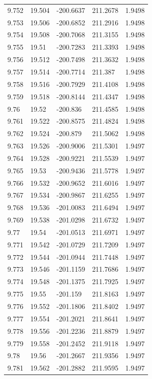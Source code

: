 \begin{tabular}{lllll}
9.752 & 19.504 & -200.6637 & 211.2678 & 1.9498 \\
9.753 & 19.506 & -200.6852 & 211.2916 & 1.9498 \\
9.754 & 19.508 & -200.7068 & 211.3155 & 1.9498 \\
9.755 & 19.51 & -200.7283 & 211.3393 & 1.9498 \\
9.756 & 19.512 & -200.7498 & 211.3632 & 1.9498 \\
9.757 & 19.514 & -200.7714 & 211.387 & 1.9498 \\
9.758 & 19.516 & -200.7929 & 211.4108 & 1.9498 \\
9.759 & 19.518 & -200.8144 & 211.4347 & 1.9498 \\
9.76 & 19.52 & -200.836 & 211.4585 & 1.9498 \\
9.761 & 19.522 & -200.8575 & 211.4824 & 1.9498 \\
9.762 & 19.524 & -200.879 & 211.5062 & 1.9498 \\
9.763 & 19.526 & -200.9006 & 211.5301 & 1.9497 \\
9.764 & 19.528 & -200.9221 & 211.5539 & 1.9497 \\
9.765 & 19.53 & -200.9436 & 211.5778 & 1.9497 \\
9.766 & 19.532 & -200.9652 & 211.6016 & 1.9497 \\
9.767 & 19.534 & -200.9867 & 211.6255 & 1.9497 \\
9.768 & 19.536 & -201.0083 & 211.6494 & 1.9497 \\
9.769 & 19.538 & -201.0298 & 211.6732 & 1.9497 \\
9.77 & 19.54 & -201.0513 & 211.6971 & 1.9497 \\
9.771 & 19.542 & -201.0729 & 211.7209 & 1.9497 \\
9.772 & 19.544 & -201.0944 & 211.7448 & 1.9497 \\
9.773 & 19.546 & -201.1159 & 211.7686 & 1.9497 \\
9.774 & 19.548 & -201.1375 & 211.7925 & 1.9497 \\
9.775 & 19.55 & -201.159 & 211.8163 & 1.9497 \\
9.776 & 19.552 & -201.1806 & 211.8402 & 1.9497 \\
9.777 & 19.554 & -201.2021 & 211.8641 & 1.9497 \\
9.778 & 19.556 & -201.2236 & 211.8879 & 1.9497 \\
9.779 & 19.558 & -201.2452 & 211.9118 & 1.9497 \\
9.78 & 19.56 & -201.2667 & 211.9356 & 1.9497 \\
9.781 & 19.562 & -201.2882 & 211.9595 & 1.9497 \\

\end{tabular}
